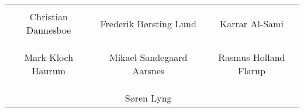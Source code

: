 \phantom{Luft}

\phantom{Luft}

\begin{table}[H]
	\centering
		\begin{tabular}{c c c}
			\underline{\phantom{mmmmmmmmmmmmmm}} & \underline{\phantom{mmmmmmmmmmmmmm}} & \underline{\phantom{mmmmmmmmmmmmmm}} \\
			Christian Dannesboe			& Frederik Børsting Lund 		& Karrar Al-Sami 			\\
			&&\\
			&&\\
			\underline{\phantom{mmmmmmmmmmmmmm}} & \underline{\phantom{mmmmmmmmmmmmmm}} & \underline{\phantom{mmmmmmmmmmmmmm}} \\
			Mark Kloch Haurum			& Mikael Sandegaard Aarsnes 		& Rasmus Holland Flarup 				\\
			&&\\
			&&\\
		 							& \underline{\phantom{mmmmmmmmmmmmmm}} 	&			\\														
									& Søren Lyng 							& 												
		\end{tabular}
\end{table}
\newpage